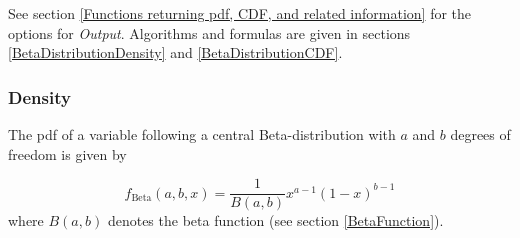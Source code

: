 \vspace{0.3cm}
See section \ref{Functions returning pdf, CDF, and related information} for the options for {\itshape\sffamily Output}. Algorithms and formulas are given in sections \ref{BetaDistributionDensity} and \ref{BetaDistributionCDF}.


%




\subsubsection{Density}
\label{BetaDistributionDensity}
The pdf of a variable following a central  Beta-distribution with $a$ and $b$ degrees of freedom is given by

\begin{equation}
	f_{\text{Beta}}(a,b,x) = \frac{1}{B(a,b)} x^{a-1}(1-x)^{b-1}
\end{equation}
where $B(a,b)$ denotes the beta function (see section \ref{BetaFunction}).

